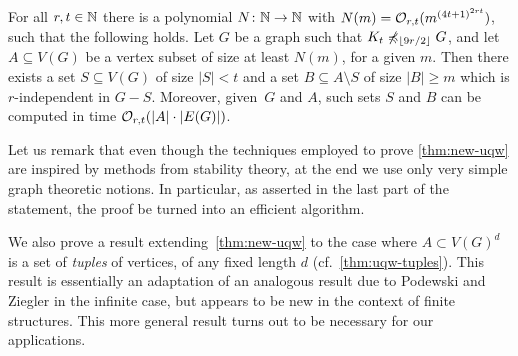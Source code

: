 \begin{theorem}\label{thm:new-uqw}
For all $r,t\in \mathbb{N}$ there is a polynomial  $N\colon \mathbb{N}\to \mathbb{N}$ with $N(m)=
\mathcal{O}_{r,t}{(m^{{(4t+1)}^{2rt}})}$, such that the following holds.
Let $G$ be a graph such that $K_t\not\preccurlyeq_{\lfloor 9r/2\rfloor} G$, and
let $A\subseteq V(G)$ be a vertex subset of size at least $N(m)$, for a given $m$.
Then there exists a set $S\subseteq V(G)$ of size $|S|<t$ and a set $B\subseteq A\setminus S$ 
of size $|B|\geq m$ which is $r$-independent in $G-S$.
Moreover, given~$G$ and $A$, such sets $S$ and $B$ can be computed in time $\mathcal{O}_{r,t}(|A|\cdot |E(G)|)$. 
\end{theorem}

Let us remark
that even though the techniques employed to prove \cref{thm:new-uqw} are inspired by methods from stability theory, 
at the end we use only very simple graph theoretic notions. In particular, as asserted in the last part of the statement, the
proof  be turned into an efficient algorithm.

We also prove a result extending~\cref{thm:new-uqw}
to the case where $A\subset V(G)^d$ is a set of \emph{tuples} of vertices, of any fixed length $d$ (cf.~\cref{thm:uqw-tuples}).
This result is essentially an adaptation of an analogous result due to Podewski and Ziegler in the infinite case,
but appears to be new in the context of finite structures.
This more general result turns out to be necessary for our applications.

